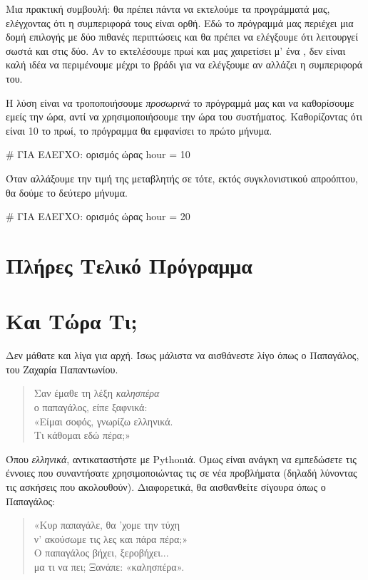 \documentclass[a4paper,11pt,oneside]{book}
\begin{document}
Μια πρακτική συμβουλή: θα πρέπει πάντα να εκτελούμε τα προγράμματά μας, ελέγχοντας ότι η συμπεριφορά τους είναι ορθή. Εδώ το πρόγραμμά μας περιέχει μια δομή επιλογής με δύο πιθανές περιπτώσεις και θα πρέπει να ελέγξουμε ότι λειτουργεί σωστά και στις δύο. Αν το εκτελέσουμε πρωί και μας χαιρετίσει μ' ένα , δεν είναι καλή ιδέα να περιμένουμε μέχρι το βράδι για να ελέγξουμε αν αλλάζει η συμπεριφορά του.

\clearpage
Η λύση είναι να τροποποιήσουμε \emph{προσωρινά} το πρόγραμμά μας και να καθορίσουμε εμείς την ώρα, αντί να χρησιμοποιήσουμε την ώρα του συστήματος.
Καθορίζοντας ότι είναι 10 το πρωί, το πρόγραμμα θα εμφανίσει το πρώτο μήνυμα. 

\begin{pycode}
# ΓΙΑ ΕΛΕΓΧΟ: ορισμός ώρας
hour = 10
\end{pycode}

Όταν αλλάξουμε την τιμή της μεταβλητής  σε  τότε, εκτός συγκλονιστικού απροόπτου, θα δούμε το δεύτερο μήνυμα. 

\begin{pycode}
# ΓΙΑ ΕΛΕΓΧΟ: ορισμός ώρας
hour = 20
\end{pycode}




\section{Πλήρες Τελικό Πρόγραμμα}



\section*{Και Τώρα Τι;}

Δεν μάθατε και λίγα για αρχή. Ίσως μάλιστα να αισθάνεστε λίγο όπως ο Παπαγάλος, του Ζαχαρία Παπαντωνίου.
\begin{quote}
Σαν έμαθε τη λέξη \emph{καλησπέρα}\\
ο παπαγάλος, είπε ξαφνικά:\\
«Είμαι σοφός, γνωρίζω ελληνικά.\\
Τι κάθομαι εδώ πέρα;»
\end{quote}
Όπου \emph{ελληνικά}, αντικαταστήστε με Pythonιά. Όμως είναι ανάγκη να εμπεδώσετε τις έννοιες που συναντήσατε χρησιμοποιώντας τις σε νέα προβλήματα (δηλαδή λύνοντας τις ασκήσεις που ακολουθούν). Διαφορετικά, θα αισθανθείτε σίγουρα όπως ο Παπαγάλος:
\begin{quote}
«Κυρ παπαγάλε, θα ’χομε την τύχη\\
ν’ ακούσωμε τις λες και πάρα πέρα;»\\
Ο παπαγάλος βήχει, ξεροβήχει...\\
μα τι να πει; Ξανάπε: «καλησπέρα».
\end{quote}
\end{document}
